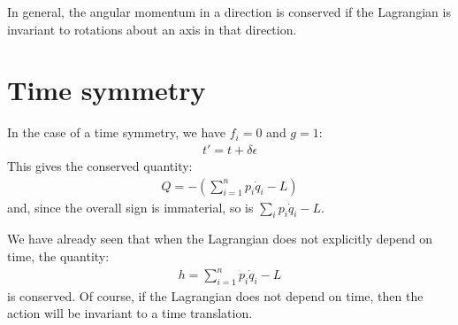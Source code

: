 In general, the angular momentum in a direction is conserved if the Lagrangian is invariant to rotations about an axis in that direction.

\section{Time symmetry}
In the case of a time symmetry, we have $f_i=0$ and $g=1$:
\begin{align}
t'=t+\delta \epsilon
\end{align}
This gives the conserved quantity:
\begin{align}
Q=-\left(\sum_{i=1}^np_i\dot{q}_i-L\right)
\end{align}
and, since the overall sign is immaterial, so is $\sum_{i}p_i\dot{q}_i-L$.

We have already seen that when the Lagrangian does not explicitly depend on time, the quantity:
\begin{align}
h=\sum_{i=1}^np_i\dot{q}_i-L
\end{align}
is conserved. Of course, if the Lagrangian does not depend on time, then the action will be invariant to a time translation.

